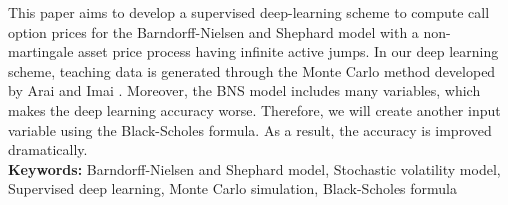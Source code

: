 This paper aims to develop a supervised deep-learning scheme to compute call option prices for the Barndorff-Nielsen and Shephard model
with a non-martingale asset price process having infinite active jumps.
In our deep learning scheme, teaching data is generated through the Monte Carlo method developed by Arai and Imai \cite{AI}.
Moreover, the BNS model includes many variables, which makes the deep learning accuracy worse.
Therefore, we will create another input variable using the Black-Scholes formula. As a result, the accuracy is improved dramatically. \\
{\bf Keywords:} Barndorff-Nielsen and Shephard model, Stochastic volatility model, Supervised deep learning, Monte Carlo simulation, Black-Scholes formula
